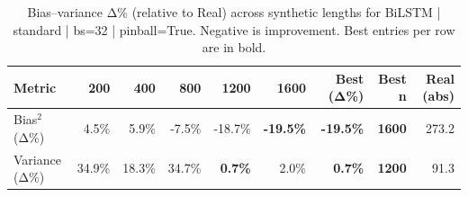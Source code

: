 \renewcommand{\arraystretch}{1.2}
\begin{table}[!t]
\centering
\footnotesize
\caption{Bias–variance Δ\% (relative to Real) across synthetic lengths for BiLSTM | standard | bs=32 | pinball=True. Negative is improvement. Best entries per row are in bold.}
\label{tab:bvdelta_BiLSTM_standard_bs32_pinballTrue}
\setlength{\tabcolsep}{5pt}
\begin{tabular}{lrrrrrrrr}
\toprule
Metric & 200 & 400 & 800 & 1200 & 1600 & Best (Δ\%) & Best n & Real (abs) \\
\midrule
Bias$^2$ (Δ\%) & 4.5\% & 5.9\% & -7.5\% & -18.7\% & \textbf{-19.5\%} & \textbf{-19.5\%} & \textbf{1600} & 273.2 \\
Variance (Δ\%) & 34.9\% & 18.3\% & 34.7\% & \textbf{0.7\%} & 2.0\% & \textbf{0.7\%} & \textbf{1200} & 91.3 \\
\bottomrule
\end{tabular}

\end{table}

